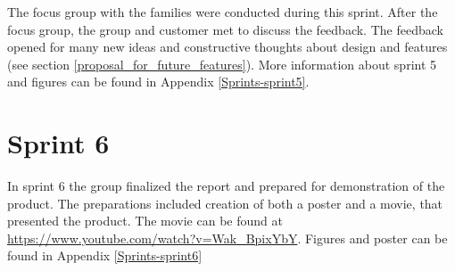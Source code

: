The focus group with the families were conducted during this sprint. After the focus group, the group and customer met to discuss the feedback. The feedback opened for many new ideas and constructive thoughts about design and features (see section \ref{proposal_for_future_features}). More information about sprint 5 and figures can be found in Appendix \ref{Sprints-sprint5}.


\section{Sprint 6}
\label{sprint6}

In sprint 6 the group finalized the report and prepared for demonstration of the product. The preparations included creation of both a poster and a movie, that presented the product. The movie can be found at \url{https://www.youtube.com/watch?v=Wak_BpixYbY}. Figures and poster can be found in Appendix \ref{Sprints-sprint6}

\cleardoublepage